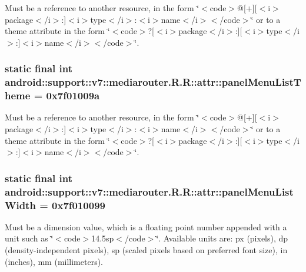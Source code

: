 Must be a reference to another resource, in the form \char`\"{}$<$code$>$@\mbox{[}+\mbox{]}\mbox{[}$<$i$>$package$<$/i$>$:\mbox{]}$<$i$>$type$<$/i$>$:$<$i$>$name$<$/i$>$$<$/code$>$\char`\"{} or to a theme attribute in the form \char`\"{}$<$code$>$?\mbox{[}$<$i$>$package$<$/i$>$:\mbox{]}\mbox{[}$<$i$>$type$<$/i$>$:\mbox{]}$<$i$>$name$<$/i$>$$<$/code$>$\char`\"{}. \hypertarget{classandroid_1_1support_1_1v7_1_1mediarouter_1_1_r_1_1attr_ebbd9878f2af4eeedc70f2a97ad8649c}{
\subsubsection[{panelMenuListTheme}]{\setlength{\rightskip}{0pt plus 5cm}static final int android::support::v7::mediarouter.R.R::attr::panelMenuListTheme = 0x7f01009a}}
\label{classandroid_1_1support_1_1v7_1_1mediarouter_1_1_r_1_1attr_ebbd9878f2af4eeedc70f2a97ad8649c}


Must be a reference to another resource, in the form \char`\"{}$<$code$>$@\mbox{[}+\mbox{]}\mbox{[}$<$i$>$package$<$/i$>$:\mbox{]}$<$i$>$type$<$/i$>$:$<$i$>$name$<$/i$>$$<$/code$>$\char`\"{} or to a theme attribute in the form \char`\"{}$<$code$>$?\mbox{[}$<$i$>$package$<$/i$>$:\mbox{]}\mbox{[}$<$i$>$type$<$/i$>$:\mbox{]}$<$i$>$name$<$/i$>$$<$/code$>$\char`\"{}. \hypertarget{classandroid_1_1support_1_1v7_1_1mediarouter_1_1_r_1_1attr_2c2846e25840e34a1afb15106408f8eb}{
\subsubsection[{panelMenuListWidth}]{\setlength{\rightskip}{0pt plus 5cm}static final int android::support::v7::mediarouter.R.R::attr::panelMenuListWidth = 0x7f010099}}
\label{classandroid_1_1support_1_1v7_1_1mediarouter_1_1_r_1_1attr_2c2846e25840e34a1afb15106408f8eb}


Must be a dimension value, which is a floating point number appended with a unit such as \char`\"{}$<$code$>$14.5sp$<$/code$>$\char`\"{}. Available units are: px (pixels), dp (density-independent pixels), sp (scaled pixels based on preferred font size), in (inches), mm (millimeters). 

